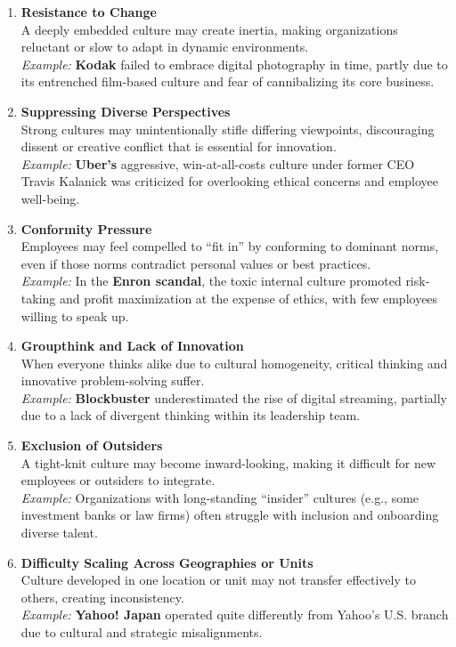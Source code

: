 \documentclass[10pt,a4paper]{book}
\begin{document}
\begin{enumerate}
    \item \textbf{Resistance to Change} \\
    A deeply embedded culture may create inertia, making organizations reluctant or slow to adapt in dynamic environments.\\
    \textit{Example:} \textbf{Kodak} failed to embrace digital photography in time, partly due to its entrenched film-based culture and fear of cannibalizing its core business.

    \item \textbf{Suppressing Diverse Perspectives} \\
    Strong cultures may unintentionally stifle differing viewpoints, discouraging dissent or creative conflict that is essential for innovation.\\
    \textit{Example:} \textbf{Uber's} aggressive, win-at-all-costs culture under former CEO Travis Kalanick was criticized for overlooking ethical concerns and employee well-being.

    \item \textbf{Conformity Pressure} \\
    Employees may feel compelled to “fit in” by conforming to dominant norms, even if those norms contradict personal values or best practices.\\
    \textit{Example:} In the \textbf{Enron scandal}, the toxic internal culture promoted risk-taking and profit maximization at the expense of ethics, with few employees willing to speak up.

    \item \textbf{Groupthink and Lack of Innovation} \\
    When everyone thinks alike due to cultural homogeneity, critical thinking and innovative problem-solving suffer.\\
    \textit{Example:} \textbf{Blockbuster} underestimated the rise of digital streaming, partially due to a lack of divergent thinking within its leadership team.

    \item \textbf{Exclusion of Outsiders} \\
    A tight-knit culture may become inward-looking, making it difficult for new employees or outsiders to integrate.\\
    \textit{Example:} Organizations with long-standing “insider” cultures (e.g., some investment banks or law firms) often struggle with inclusion and onboarding diverse talent.

    \item \textbf{Difficulty Scaling Across Geographies or Units} \\
    Culture developed in one location or unit may not transfer effectively to others, creating inconsistency.\\
    \textit{Example:} \textbf{Yahoo! Japan} operated quite differently from Yahoo’s U.S. branch due to cultural and strategic misalignments.

\end{enumerate}
\end{document}
